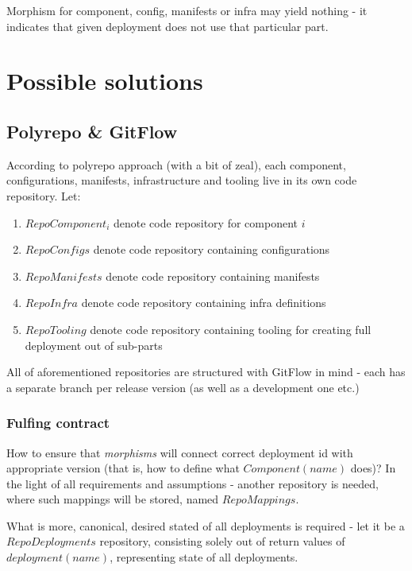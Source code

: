 \documentclass{article}
\begin{document}
\begin{warn}[Notice:]
  Morphism for component, config, manifests or infra may yield nothing - it indicates that given deployment does not use that particular part.
\end{warn}

\section{Possible solutions}
\subsection{Polyrepo \& GitFlow}
According to polyrepo approach (with a bit of zeal), each component, configurations, manifests, infrastructure and tooling live in its own code repository. 
\newline\newline
Let:
\begin{enumerate}
	\item $RepoComponent_i$ denote code repository for component $i$
	\item $RepoConfigs$ denote code repository containing configurations
	\item $RepoManifests$ denote code repository containing manifests
	\item $RepoInfra$ denote code repository containing infra definitions
	\item $RepoTooling$ denote code repository containing tooling for creating full deployment out of sub-parts
\end{enumerate}

All of aforementioned repositories are structured with GitFlow in mind - each has a 
separate branch per release version (as well as a development one etc.)

\subsubsection{Fulfing contract}

How to ensure that \emph{morphisms} will connect correct deployment id with appropriate version (that is, how to define what $Component(name)$ does)?
In the light of all requirements and assumptions - another repository is needed, where such mappings will be stored, named $RepoMappings$. 

What is more, canonical, desired stated of all deployments is required - let it be a $RepoDeployments$ repository, consisting solely out of return values of $deployment(name)$, representing state of all deployments.
\end{document}
